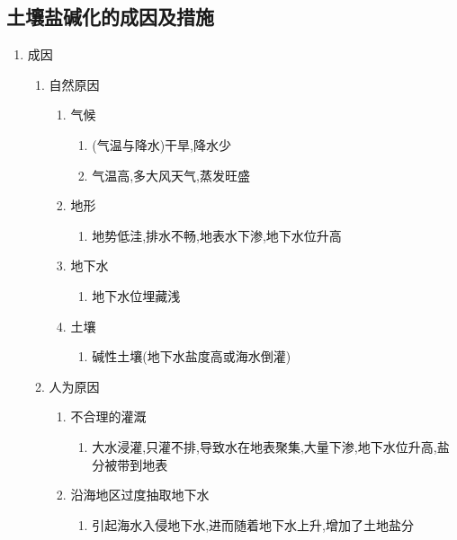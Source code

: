 \documentclass[a4paper]{article}
\begin{document}
    \subsection{土壤盐碱化的成因及措施}
    \begin{enumerate}
        \item 成因
        \begin{enumerate}
            \item 自然原因
            \begin{enumerate} %
                \item 气候
                \begin{enumerate}
                    \item (气温与降水)干旱,降水少
                    \item 气温高,多大风天气,蒸发旺盛
                \end{enumerate}
                \item 地形
                \begin{enumerate}
                    \item 地势低洼,排水不畅,地表水下渗,地下水位升高
                \end{enumerate}
                \item 地下水
                \begin{enumerate}
                    \item 地下水位埋藏浅
                \end{enumerate}
                \item 土壤
                \begin{enumerate}
                    \item 碱性土壤(地下水盐度高或海水倒灌)
                \end{enumerate}
            \end{enumerate}
            \item 人为原因
            \begin{enumerate} %
                \item 不合理的灌溉
                \begin{enumerate}
                    \item 大水浸灌,只灌不排,导致水在地表聚集,大量下渗,地下水位升高,盐分被带到地表
                \end{enumerate}
                \item 沿海地区过度抽取地下水
                \begin{enumerate}
                    \item 引起海水入侵地下水,进而随着地下水上升,增加了土地盐分

\end{enumerate}
\end{enumerate}
\end{enumerate}
\end{enumerate}
\end{document}
